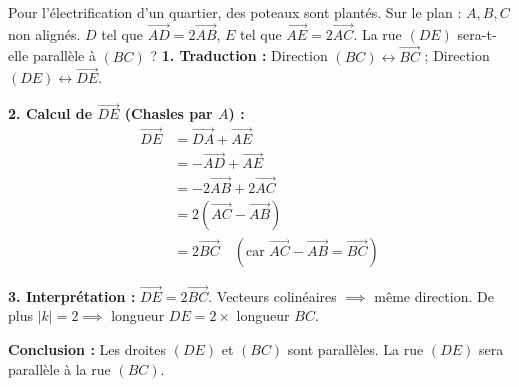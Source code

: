 \documentclass[11pt]{article}
\begin{document}
\begin{exoresolu}
Pour l'électrification d'un quartier, des poteaux sont plantés. Sur le plan : $A, B, C$ non alignés. $D$ tel que $\overrightarrow{AD} = 2\overrightarrow{AB}$, $E$ tel que $\overrightarrow{AE} = 2\overrightarrow{AC}$.
La rue $(DE)$ sera-t-elle parallèle à $(BC)$ ?
\tcblower
\textbf{1. Traduction :} Direction $(BC) \leftrightarrow \overrightarrow{BC}$ ; Direction $(DE) \leftrightarrow \overrightarrow{DE}$.

\textbf{2. Calcul de $\overrightarrow{DE}$ (Chasles par $A$) :}
\begin{align*}
\overrightarrow{DE} &= \overrightarrow{DA} + \overrightarrow{AE} \\
&= -\overrightarrow{AD} + \overrightarrow{AE} \\
&= -2\overrightarrow{AB} + 2\overrightarrow{AC} \\
&= 2(\overrightarrow{AC} - \overrightarrow{AB}) \\
&= 2\overrightarrow{BC} \quad (\text{car } \overrightarrow{AC} - \overrightarrow{AB} = \overrightarrow{BC})
\end{align*}

\textbf{3. Interprétation :} $\overrightarrow{DE} = 2\overrightarrow{BC}$. Vecteurs colinéaires $\implies$ même direction.
De plus $|k|=2 \implies$ longueur $DE = 2 \times$ longueur $BC$.

\textbf{Conclusion :} Les droites $(DE)$ et $(BC)$ sont parallèles. La rue $(DE)$ sera parallèle à la rue $(BC)$.
\end{exoresolu}
\end{document}
